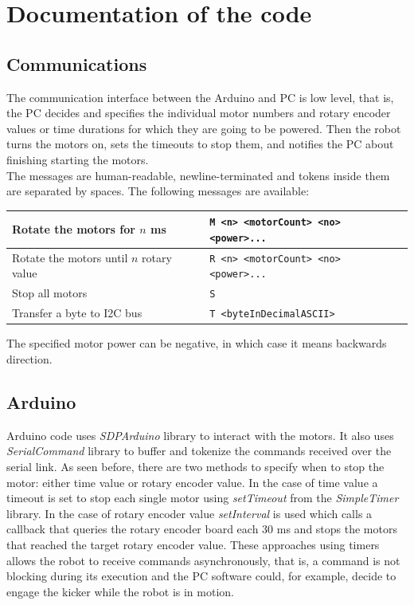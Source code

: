 \documentclass[12pt]{article}
\begin{document}
\section{Documentation of the code}

\subsection{Communications}

The communication interface between the Arduino and PC is low level, that is,
the PC decides and specifies the individual motor numbers and rotary encoder
values or time durations for which they are going to be powered. Then the robot
turns the motors on, sets the timeouts to stop them, and notifies the PC about
finishing starting the motors.
\\The messages are human-readable, newline-terminated and tokens inside them are
separated by spaces. The following messages are available:

\begin{tabular}{ | l | l | }
    \hline
    Rotate the motors for $n$ ms &
    \texttt{M <n> <motorCount> <no> <power>...} \\ \hline
    Rotate the motors until $n$ rotary value &
    \texttt{R <n> <motorCount> <no> <power>...} \\ \hline
    Stop all motors &
    \texttt{S} \\ \hline
    Transfer a byte to I2C bus &
    \texttt{T <byteInDecimalASCII>} \\ \hline
\end{tabular}

The specified motor power can be negative, in which case it means backwards
direction.

\subsection{Arduino}

Arduino code uses \textit{SDPArduino} library to interact with the motors.
It also uses \textit{SerialCommand} library to buffer and tokenize the
commands received over the serial link. As seen before, there are two methods to
specify when to stop the motor: either time value or rotary encoder value.
In the case of time value a timeout is set to stop each single motor using
\textit{setTimeout} from the \textit{SimpleTimer} library.
In the case of rotary encoder value \textit{setInterval} is used which calls
a callback that queries the rotary encoder board each 30 ms and stops the motors
that reached the target rotary encoder value. These approaches using timers
allows the robot to receive commands asynchronously, that is, a command is not
blocking during its execution and the PC software could, for example, decide
to engage the kicker while the robot is in motion.
\end{document}
